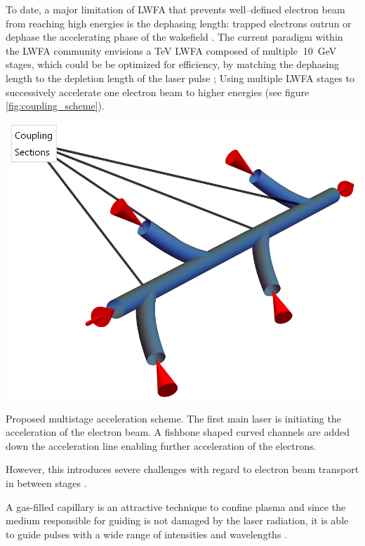 \documentclass[justified,nofonts,nobib,openany]{tufte-book}
\begin{document}
To date, a major limitation of LWFA that prevents well--defined electron beam from reaching high energies is the dephasing length: trapped electrons outrun or dephase the accelerating phase of the wakefield \cite{Esarey2009PhysicsAccelerators}. The current paradigm within the LWFA community envisions a \si{\TeV} LWFA composed of multiple $~$\SI{10}{\GeV} stages, which could be be optimized for efficiency, by matching the dephasing length to the depletion length of the laser pulse \cite{Schroeder2010PhysicsColliders}; Using multiple LWFA stages to successively accelerate one electron beam to higher energies (see figure \ref{fig:coupling_scheme}).
\begin{marginfigure}
\includegraphics[width=\marginparwidth]{figures/coupling_scheme.png}
\caption{Proposed multistage acceleration scheme. The first main laser is initiating the acceleration of the electron beam. A fishbone shaped curved channels are added down the acceleration line enabling further acceleration of the electrons.}
\label{fig:coupling_scheme}
\end{marginfigure}
However, this introduces severe challenges with regard to electron beam transport in between stages \cite{Esarey2009PhysicsAccelerators}.

A gas-filled capillary is an attractive technique to confine plasma \cite{Bobrova2002SimulationsWaveguide,Spence2001InvestigationWaveguide} and since the medium responsible for guiding is not damaged by the laser radiation, it is able to guide pulses with a wide range of intensities and wavelengths \cite{Dorchies1999MonomodeTubes}.
\end{document}
